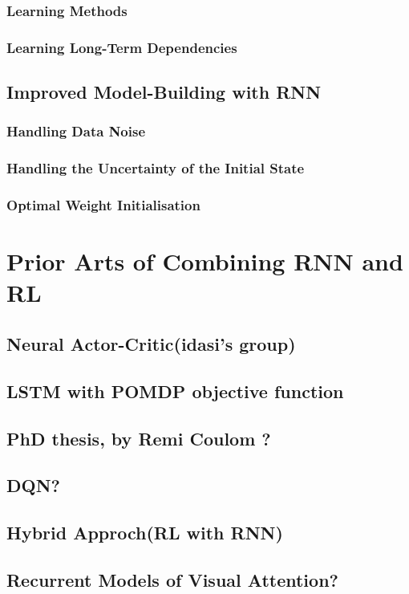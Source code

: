 \documentclass[officiallayout]{tktla}
\begin{document}
\subsection{Learning Methods}
\subsection{Learning Long-Term Dependencies}

\section{Improved Model-Building with RNN} 
\subsection{Handling Data Noise} 
\subsection{Handling the Uncertainty of the Initial State}
\subsection{Optimal Weight Initialisation}

\chapter{Prior Arts of Combining RNN and RL}
\section{Neural Actor-Critic(idasi's group)}
\section{LSTM with POMDP objective function}
\section{PhD thesis, by Remi Coulom ?}

\section{DQN?}
\section{Hybrid Approch(RL with RNN)}
\section{Recurrent Models of Visual Attention?}       
\end{document}
